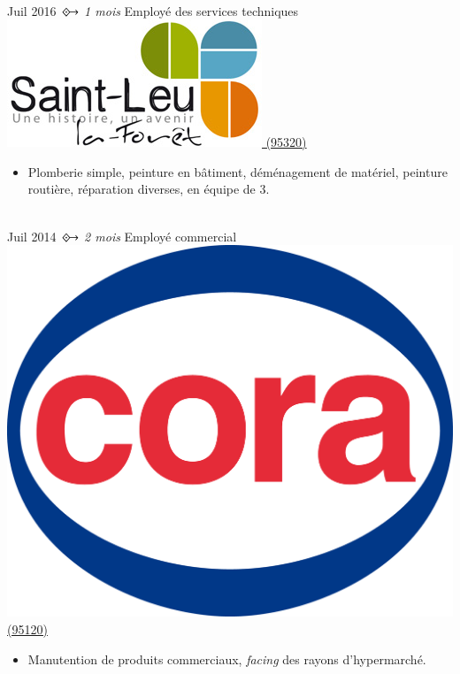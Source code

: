 \documentclass[letterpaper]{twentysecondcv} %
\begin{document}
\begin{twenty}
{            \vspace{-0.20cm}
        }
        \\
	\twentyitem
    	{Juil 2016}
    	{$\Diamonddotright$\textit{\small{ 1 mois}}}
        {Employé des services techniques}
        {\href{http://www.saint-leu-la-foret.fr/}{\includegraphics[scale=0.18]{img/saint-leu-la-foret.png} \hspace{0.5cm} (95320)}}
        {}
        {\vspace{-0.20cm}
            {\begin{itemize}
                \item Plomberie simple, peinture en bâtiment, déménagement de matériel, peinture routière, réparation diverses, en équipe de 3.
            \end{itemize}}
            \vspace{-0.20cm}
        }
    \\   
    \twentyitem
   		{Juil 2014}
		{$\Diamonddotright$\textit{\small{ 2 mois}}}
        {Employé commercial}
        {\href{http://www.cora.fr/ermont/}{\includegraphics[scale=0.05]{img/Logo_cora_2011.png} \hspace{0.5cm}(95120)}}
        {}
        {\vspace{-0.20cm}
            \begin{itemize}
                \item Manutention de produits commerciaux, \textit{facing} des rayons d'hypermarché.
            \end{itemize}
        }
\end{twenty}\\
\end{document}
